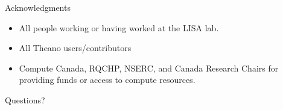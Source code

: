 \documentclass[utf8x,xcolor=pdftex,dvipsnames,table]{beamer}
\begin{document}
\begin{frame}{Acknowledgments}
\begin{itemize}
\item All people working or having worked at the LISA lab.
\item All Theano users/contributors
\item Compute Canada, RQCHP, NSERC, and Canada Research Chairs for providing funds or access to compute resources.
\end{itemize}
\end{frame}

\begin{frame}
\begin{center}
\Huge
Questions?
\end{center}
\end{frame}
\end{document}
